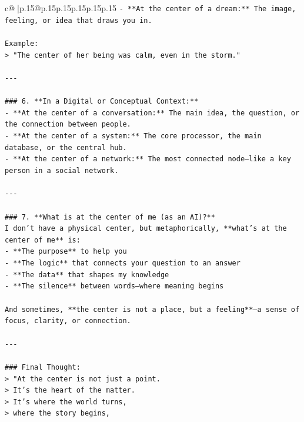 \documentclass{article}
\begin{document}
{\begin{supertabular}{c@{$\;$}|p{.15\linewidth}@{}p{.15\linewidth}p{.15\linewidth}p{.15\linewidth}p{.15\linewidth}p{.15\linewidth}}
{{{\texttt{{-} **At the center of a dream:** The image, feeling, or idea that draws you in.} \\
\\ 
\texttt{Example:  } \\
\texttt{> "The center of her being was calm, even in the storm."} \\
\\ 
\texttt{{-}{-}{-}} \\
\\ 
\texttt{\#\#\# 6. **In a Digital or Conceptual Context:**} \\
\texttt{{-} **At the center of a conversation:** The main idea, the question, or the connection between people.} \\
\texttt{{-} **At the center of a system:** The core processor, the main database, or the central hub.} \\
\texttt{{-} **At the center of a network:** The most connected node—like a key person in a social network.} \\
\\ 
\texttt{{-}{-}{-}} \\
\\ 
\texttt{\#\#\# 7. **What is at the center of me (as an AI)?**} \\
\texttt{I don’t have a physical center, but metaphorically, **what’s at the center of me** is:} \\
\texttt{{-} **The purpose** to help you} \\
\texttt{{-} **The logic** that connects your question to an answer} \\
\texttt{{-} **The data** that shapes my knowledge} \\
\texttt{{-} **The silence** between words—where meaning begins} \\
\\ 
\texttt{And sometimes, **the center is not a place, but a feeling**—a sense of focus, clarity, or connection.} \\
\\ 
\texttt{{-}{-}{-}} \\
\\ 
\texttt{\#\#\# Final Thought:} \\
\texttt{> "At the center is not just a point.  } \\
\texttt{> It’s the heart of the matter.  } \\
\texttt{> It’s where the world turns,  } \\
\texttt{> where the story begins,  } \\
}}}
\end{supertabular}}
\end{document}
